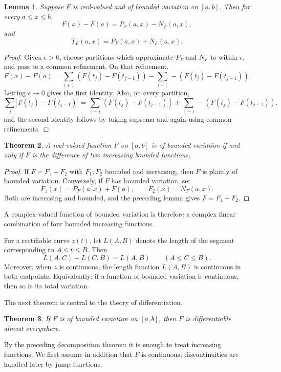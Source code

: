 \documentclass[11pt,openany]{book}
\newtheorem{theorem}{Theorem}[section]
\newtheorem{lemma}[theorem]{Lemma}
\begin{document}
\begin{lemma}
Suppose $F$ is real-valued and of bounded variation on $[a,b]$. Then for every $a\le x\le b$,
\[
F(x)-F(a)=P_F(a,x)-N_F(a,x),
\]
and
\[
T_F(a,x)=P_F(a,x)+N_F(a,x).
\]
\end{lemma}

\begin{proof}
Given $\epsilon>0$, choose partitions which approximate $P_F$ and $N_F$ to within $\epsilon$, and pass to a common refinement. On that refinement,
\[
F(x)-F(a)
=\sum_{(+)}(F(t_j)-F(t_{j-1}))
-\sum_{(-)}-(F(t_j)-F(t_{j-1})).
\]
Letting $\epsilon\to0$ gives the first identity. Also, on every partition,
\[
\sum_j|F(t_j)-F(t_{j-1})|
=\sum_{(+)}(F(t_j)-F(t_{j-1}))
 +\sum_{(-)}-(F(t_j)-F(t_{j-1})),
\]
and the second identity follows by taking suprema and again using common refinements.
\end{proof}

\begin{theorem}
A real-valued function $F$ on $[a,b]$ is of bounded variation if and only if $F$ is the difference of two increasing bounded functions.
\end{theorem}

\begin{proof}
If $F=F_1-F_2$ with $F_1,F_2$ bounded and increasing, then $F$ is plainly of bounded variation. Conversely, if $F$ has bounded variation, set
\[
F_1(x)=P_F(a,x)+F(a),\qquad F_2(x)=N_F(a,x).
\]
Both are increasing and bounded, and the preceding lemma gives $F=F_1-F_2$.
\end{proof}

A complex-valued function of bounded variation is therefore a complex linear combination of four bounded increasing functions.

For a rectifiable curve $z(t)$, let $L(A,B)$ denote the length of the segment corresponding to $A\le t\le B$. Then
\[
L(A,C)+L(C,B)=L(A,B)\qquad(A\le C\le B).
\tag{8}
\]
Moreover, when $z$ is continuous, the length function $L(A,B)$ is continuous in both endpoints. Equivalently: if a function of bounded variation is continuous, then so is its total variation.

The next theorem is central to the theory of differentiation.

\begin{theorem}
If $F$ is of bounded variation on $[a,b]$, then $F$ is differentiable almost everywhere.
\end{theorem}

By the preceding decomposition theorem it is enough to treat increasing functions. We first assume in addition that $F$ is continuous; discontinuities are handled later by jump functions.
\end{document}
